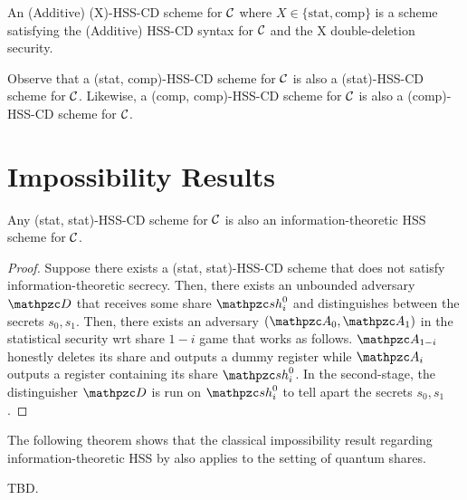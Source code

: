 \begin{definition} An (Additive)
(X)-HSS-CD scheme for $\mathcal{C}$ where $X \in \{\textrm{stat},
\textrm{comp}\}$ is a scheme satisfying the (Additive) HSS-CD syntax
for $\mathcal{C}$ and the X double-deletion security.
\end{definition}

\begin{remark}
Observe that a (stat, comp)-HSS-CD scheme for $\mathcal{C}$ is also
a (stat)-HSS-CD scheme for $\mathcal{C}$. Likewise, a (comp,
comp)-HSS-CD scheme for $\mathcal{C}$ is also a (comp)-HSS-CD scheme for
$\mathcal{C}$.
\end{remark}

\section{Impossibility Results}

\begin{lemma}
Any (stat, stat)-HSS-CD scheme for $\cal{C}$ is also an
information-theoretic HSS scheme for $\mathcal{C}$.
\end{lemma}
\begin{proof}
Suppose there exists a (stat, stat)-HSS-CD scheme that does not
satisfy information-theoretic secrecy. Then, there exists an
unbounded adversary $\qD$ that receives some share $\qsh_i^0$ and
distinguishes between the secrets $s_0, s_1$. Then, there exists an
adversary $(\qA_0, \qA_1)$ in the statistical security wrt share
$1-i$ game that works as follows. $\qA_{1-i}$ honestly deletes its
share and outputs a dummy register while $\qA_i$ outputs a register
containing its share $\qsh_i^0$. In the second-stage, the
distinguisher $\qD$ is run on $\qsh_i^0$ to tell apart the secrets
$s_0, s_1$.
\end{proof}

The following theorem shows that the classical impossibility result
regarding information-theoretic HSS by \cite{ITCS:BGILT18} also
applies to the setting of quantum shares.

\begin{theorem}
TBD.
\end{theorem}

